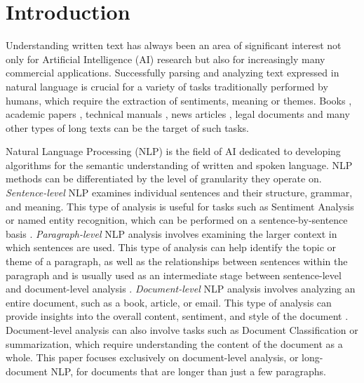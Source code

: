 \documentclass[preprint,review,12pt]{elsarticle}
\begin{document}
\section{Introduction}
Understanding written text has always been an area of significant interest not only for Artificial Intelligence (AI) research but also for increasingly many commercial applications. Successfully parsing and analyzing text expressed in natural language is crucial for a variety of tasks traditionally performed by humans, which require the extraction of sentiments, meaning or themes. Books \cite{worsham}, academic papers \cite{gales}, technical manuals \cite{nabizadeh}, news articles \cite{shuo}, legal documents \cite{merchant} and many other types of long texts can be the target of such tasks.

Natural Language Processing (NLP) is the field of AI dedicated to developing algorithms for the semantic understanding of written and spoken language. NLP methods can be differentiated by the level of granularity they operate on. \textit{Sentence-level} NLP examines individual sentences and their structure, grammar, and meaning. This type of analysis is useful for tasks such as Sentiment Analysis or named entity recognition, which can be performed on a sentence-by-sentence basis \cite{borgir}. \textit{Paragraph-level} NLP analysis involves examining the larger context in which sentences are used. This type of analysis can help identify the topic or theme of a paragraph, as well as the relationships between sentences within the paragraph and is usually used as an intermediate stage between sentence-level and document-level analysis \cite{andrew} \cite{guo} \cite{jiwei}. \textit{Document-level} NLP analysis involves analyzing an entire document, such as a book, article, or email. This type of analysis can provide insights into the overall content, sentiment, and style of the document \cite{wei}\cite{timothy}. Document-level analysis can also involve tasks such as Document Classification or summarization, which require understanding the content of the document as a whole. This paper focuses exclusively on document-level analysis, or long-document NLP, for documents that are longer than just a few paragraphs.
\end{document}
